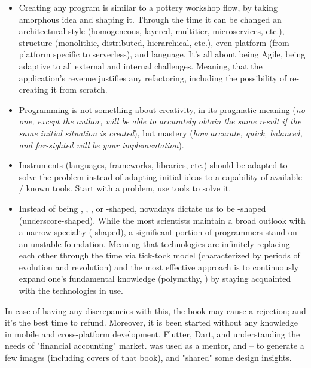 \begin{itemize}
\setlength{\itemsep}{3pt}
\setlength{\parskip}{0pt}
\setlength{\parsep}{0pt}
    \item Creating any program is similar to a pottery workshop flow, by taking amorphous idea and shaping it. Through 
    the time it can be changed an architectural style (homogeneous, layered, multitier, microservices, etc.), structure 
    (monolithic, distributed, hierarchical, etc.), even platform (from platform specific to serverless), and language. 
    It's all about being Agile, being adaptive to all external and internal challenges. Meaning, that the application's 
    revenue justifies any refactoring, including the possibility of re-creating it from scratch.

    \item Programming is not something about creativity, in its pragmatic meaning (\emph{no one, except the author, 
    will be able to accurately obtain the same result if the same initial situation is created}), but mastery 
    (\emph{how accurate, quick, balanced, and far-sighted will be your implementation}).

    \item Instruments (languages, frameworks, libraries, etc.) should be adapted to solve the problem instead of 
    adapting initial ideas to a capability of available / known tools. Start with a problem, use tools to solve it.

    \item Instead of being , , , or -shaped, nowadays dictate us to be \q{\_}-shaped 
    (underscore-shaped). While the most scientists maintain a broad outlook with a narrow specialty (-shaped), a 
    significant portion of programmers stand on an unstable foundation. Meaning that technologies are infinitely 
    replacing each other through the time via tick-tock model (characterized by periods of evolution and revolution) 
    and the most effective approach is to continuously expand one's fundamental knowledge (polymathy, \cite{Root09}) 
    by staying acquainted with the technologies in use. 
\end{itemize}

\noindent In case of having any discrepancies with this, the book may cause a rejection; and it's the best time to 
refund. Moreover, it is been started without any knowledge in mobile and cross-platform development, Flutter, Dart, and 
understanding the needs of "financial accounting" market.  was used as a mentor, and  --
to generate a few images (including covers of that book), and "shared" some design insights.

